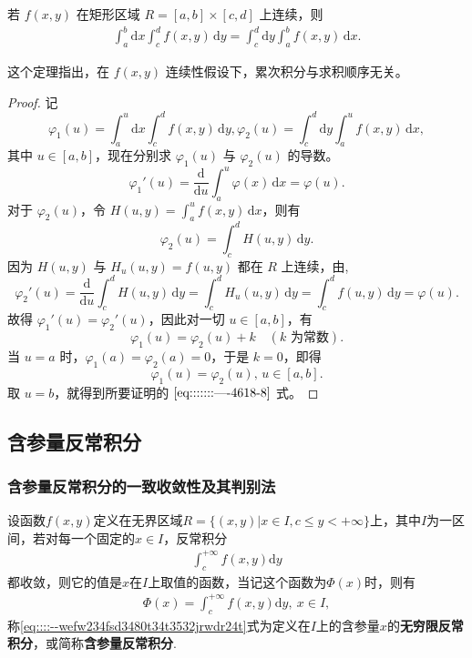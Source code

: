 \documentclass[../../main.tex]{subfiles}
\begin{document}
\begin{theorem}
若 \( f(x,y) \) 在矩形区域 \( R = [a,b] \times [c,d] \) 上连续，则
\begin{align}
\int_{a}^{b} \mathrm{d}x \int_{c}^{d} f(x,y) \, \mathrm{d}y = \int_{c}^{d} \mathrm{d}y \int_{a}^{b} f(x,y) \, \mathrm{d}x. \label{eq:::::::----4618-8}
\end{align}
\end{theorem}
\begin{note}
这个定理指出，在 \( f(x,y) \) 连续性假设下，累次积分与求积顺序无关。
\end{note}
\begin{proof}
记
\[
\varphi_1(u) = \int_{a}^{u} \mathrm{d}x \int_{c}^{d} f(x,y) \, \mathrm{d}y,
\varphi_2(u) = \int_{c}^{d} \mathrm{d}y \int_{a}^{u} f(x,y) \, \mathrm{d}x,
\]
其中 \( u \in [a,b] \)，现在分别求 \( \varphi_1(u) \) 与 \( \varphi_2(u) \) 的导数。
\[
\varphi_1'(u) = \frac{\mathrm{d}}{\mathrm{d}u} \int_{a}^{u} \varphi(x) \, \mathrm{d}x = \varphi(u).
\]
对于 \( \varphi_2(u) \)，令 \( H(u,y) = \int_{a}^{u} f(x,y) \, \mathrm{d}x \)，则有
\[
\varphi_2(u) = \int_{c}^{d} H(u,y) \, \mathrm{d}y.
\]
因为 \( H(u,y) \) 与 \( H_u(u,y) = f(u,y) \) 都在 \( R \) 上连续，由,
\[
\varphi_2'(u) = \frac{\mathrm{d}}{\mathrm{d}u} \int_{c}^{d} H(u,y) \, \mathrm{d}y = \int_{c}^{d} H_u(u,y) \, \mathrm{d}y
= \int_{c}^{d} f(u,y) \, \mathrm{d}y = \varphi(u).
\]
故得 \( \varphi_1'(u) = \varphi_2'(u) \)，因此对一切 \( u \in [a,b] \)，有
\[
\varphi_1(u) = \varphi_2(u) + k \quad (k \text{ 为常数}).
\]
当 \( u = a \) 时，\( \varphi_1(a) = \varphi_2(a) = 0 \)，于是 \( k = 0 \)，即得
\[
\varphi_1(u) = \varphi_2(u), \, u \in [a,b].
\]
取 \( u = b \)，就得到所要证明的 \(\eqref{eq:::::::----4618-8}\) 式。

\end{proof}




\subsection{含参量反常积分}

\subsubsection{含参量反常积分的一致收敛性及其判别法}

\begin{definition}[含参量反常积分]
设函数$f(x,y)$定义在无界区域$R=\{(x,y)|x\in I,c\leqslant y<+\infty\}$上，其中$I$为一区间，若对每一个固定的$x\in I$，反常积分
\begin{align}
\int_{c}^{+\infty}f(x,y)\mathrm{d}y \label{eq::::--wefw234fsd3480t34t3532jrwdr24t}
\end{align}
都收敛，则它的值是$x$在$I$上取值的函数，当记这个函数为$\varPhi(x)$时，则有
\begin{align}
\varPhi(x)=\int_{c}^{+\infty}f(x,y)\mathrm{d}y,\ x\in I, \label{eq::::--wefw234fsd3480t34t32jrwdr24t}
\end{align}
称\eqref{eq::::--wefw234fsd3480t34t3532jrwdr24t}式为定义在$I$上的含参量$x$的\textbf{无穷限反常积分}，或简称\textbf{含参量反常积分}.
\end{definition}
\end{document}
